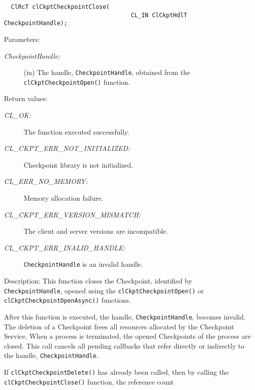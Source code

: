 \begin{flushleft}
\begin{Desc}
\footnotesize\begin{verbatim}  ClRcT clCkptCheckpointClose(
                              		CL_IN ClCkptHdlT CheckpointHandle);
\end{verbatim}
\normalsize
\end{Desc}
\begin{Desc}
\item[Parameters:]
\begin{description}
\item[{\em Checkpoint\-Handle:}](in) The handle, {\tt{Checkpoint\-Handle}}, obtained from the 
{\tt{clCkptCheckpointOpen()}} function.\end{description}
\end{Desc}
\begin{Desc}
\item[Return values:]
\begin{description}
\item[{\em CL\_\-OK:}]The function executed successfully. 
\item[{\em CL\_\-CKPT\_\-ERR\_\-NOT\_\-INITIALIZED:}]Checkpoint library is not initialized. 
\item[{\em CL\_\-ERR\_\-NO\_\-MEMORY:}]Memory allocation failure.
\item[{\em CL\_\-CKPT\_\-ERR\_\-VERSION\_\-MISMATCH:}]The client and server versions are incompatible.
\item[{\em CL\_\-CKPT\_\-ERR\_\-INALID\_\-HANDLE:}]{\tt{CheckpointHandle}} is an invalid handle.
\end{description}
\end{Desc}
\begin{Desc}
\item[Description:]This function closes the Checkpoint, identified by {\tt{Checkpoint\-Handle}}, opened using the 
{\tt{clCkptCheckpointOpen()}} or {\tt{clCkptCheckpointOpenAsync()}} functions. \par
 \par
 After this function is executed, the handle, {\tt{Checkpoint\-Handle}}, becomes invalid. The deletion of a Checkpoint frees all resources allocated by the 
 Checkpoint Service. When a process is terminated, the opened Checkpoints of the process are closed. This call cancels all pending callbacks that refer
 directly or indirectly to the handle, {\tt{Checkpoint\-Handle}}. \par
 \par
 If {\tt{clCkptCheckpointDelete()}} has already been called, then by calling the {\tt{clCkptCheckpointClose()}} function, the reference count 

\end{Desc}
\end{flushleft}
